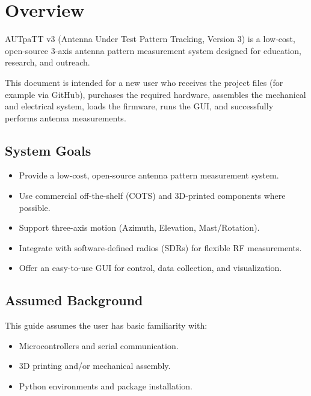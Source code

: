 \chapter{Overview}

AUTpaTT v3 (Antenna Under Test Pattern Tracking, Version 3) is a low-cost, open-source 3-axis antenna pattern measurement system designed for education, research, and outreach.

This document is intended for a new user who receives the project files (for example via GitHub), purchases the required hardware, assembles the mechanical and electrical system, loads the firmware, runs the GUI, and successfully performs antenna measurements.

\section{System Goals}

\begin{itemize}
  \item Provide a low-cost, open-source antenna pattern measurement system.
  \item Use commercial off-the-shelf (COTS) and 3D-printed components where possible.
  \item Support three-axis motion (Azimuth, Elevation, Mast/Rotation).
  \item Integrate with software-defined radios (SDRs) for flexible RF measurements.
  \item Offer an easy-to-use GUI for control, data collection, and visualization.
\end{itemize}

\section{Assumed Background}

This guide assumes the user has basic familiarity with:

\begin{itemize}
  \item Microcontrollers and serial communication.
  \item 3D printing and/or mechanical assembly.
  \item Python environments and package installation.
\end{itemize}
